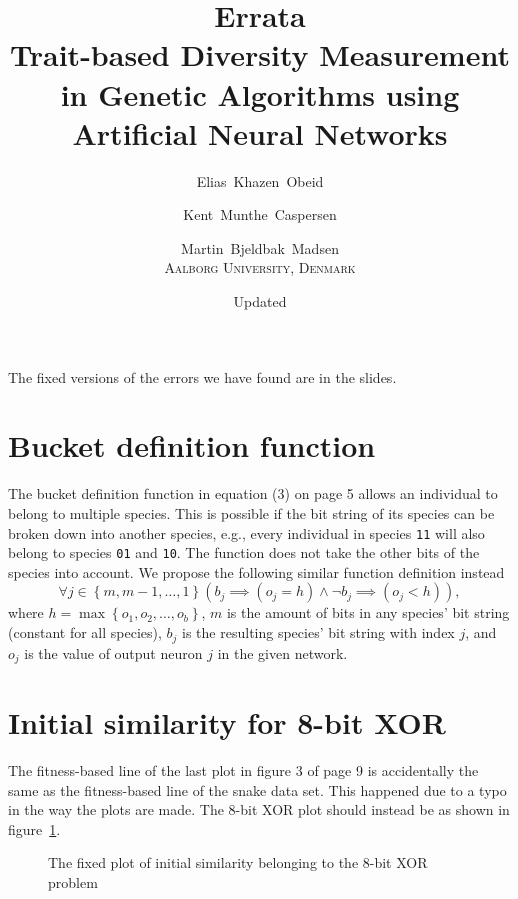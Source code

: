 \documentclass{memoir}
\title{Errata\\
\Large Trait-based Diversity Measurement in Genetic Algorithms using Artificial Neural Networks}
\author{Elias~Khazen~Obeid \and
        Kent~Munthe~Caspersen \and
      Martin~Bjeldbak~Madsen\\
    \scshape Aalborg University, Denmark}
\date{Updated \formatdate{20}{6}{2014}}
\begin{document}
\pagestyle{empty}
\maketitle
\thispagestyle{empty}

The fixed versions of the errors we have found are in the slides.

\section*{Bucket definition function}
The bucket definition function in equation (3) on page 5 allows an individual to belong to multiple species. This is possible if the bit string of its species can be broken down into another species, e.g., every individual in species \texttt{11} will also belong to species \texttt{01} and \texttt{10}. The function does not take the other bits of the species into account. We propose the following similar function definition instead
\begin{equation*}
  \forall j \in \left\{m, m-1,\dots,1\right\}\left(b_j \implies \left(o_j = h\right) \land \neg b_j \implies\left(o_j < h\right)\right),
\end{equation*}
where $h = \max\left\{o_1, o_2, \dots, o_b\right\}$, $m$ is the amount of bits in any species' bit string (constant for all species), $b_j$ is the resulting species' bit string with index $j$, and $o_j$ is the value of output neuron $j$ in the given network.

\section*{Initial similarity for 8-bit XOR}
The fitness-based line of the last plot in figure 3 of page 9 is accidentally the same as the fitness-based line of the snake data set. This happened due to a typo in the way the plots are made. The 8-bit XOR plot should instead be as shown in figure~\ref{fig:initial-similarity-xor}.

\begin{figure}[htbp]
  \centering
  \resizebox{0.5\linewidth}{!}{%
  
}
  \caption{The fixed plot of initial similarity belonging to the 8-bit XOR problem}\label{fig:initial-similarity-xor}
\end{figure}
\end{document}

